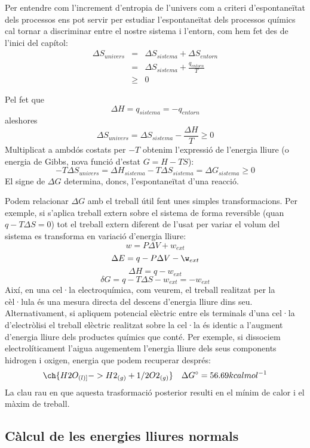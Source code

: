 Per entendre com l'increment d'entropia de l'univers com a criteri d'espontaneïtat dels processos ens pot servir per estudiar l'espontaneïtat dels processos químics cal tornar a discriminar entre el nostre sistema i l'entorn, com hem fet des de l'inici del capítol:
\begin{eqnarray*}
\Delta S_{univers} &= &\Delta S_{sistema} + \Delta S_{entorn}\\
&=&\Delta S_{sistema} + \frac{q_{entorn}}{T}\\
&\geq & 0
\end{eqnarray*}

Pel fet que
\[
\Delta H= q_{sistema} = -q_{entorn}
\]
aleshores
\[
\Delta S_{univers} = \Delta S_{sistema} - \frac{\Delta H}{T} \geq 0
\]
Multiplicat a ambdós costats per $-T$ obtenim l'expressió de l'energia lliure (o energia de Gibbs, nova funció d'estat $G=H-TS$):
\begin{equation}
-T \Delta S_{univers} = \Delta H_{sistema} -T\Delta S_{sistema}= \Delta G_{sistema} \geq 0
\label{Eq:Gibbs}
\end{equation}
El signe de $\Delta G$ determina, doncs, l'espontaneïtat d'una reacció.

Podem relacionar $\Delta G$ amb el treball útil fent unes simples transformacions. Per exemple, si s'aplica treball extern sobre el sistema de forma reversible (quan $q-T\Delta S=0$) tot el treball extern diferent de l'usat per variar el volum del sistema es transforma en variació d'energia lliure:
\[w=P\Delta V + w_{ext}\]
\[\Delta E = q-P\Delta V -\w_{ext}\]
\[\Delta H= q-w_{ext}\]
\[\delta G = q - T\Delta S -w_{ext} = -w_{ext}\]
Així, en una cel·la electroquímica, com veurem, el treball realitzat per la cèl·lula és una mesura directa del descens 
d'energia lliure dins seu. Alternativament, si apliquem potencial elèctric entre els terminals d'una cel·la d'electròlisi el treball elèctric realitzat sobre la cel·la és identic a l'augment d'energia lliure dels productes químics que conté. Per exemple, si dissociem electrolíticament l'aigua augementem l'energia lliure dels seus components hidrogen i oxigen, energia que podem recuperar després:
\[\ch{H2O_{(l)]} -> H2_{(g)} + 1/2 O2_{(g)}} \quad \Delta G^{\circ}= 56.69 kcal mol^{-1}\]
La clau rau en que aquesta trasformació posterior resulti en el mínim de calor i el màxim de treball.

\subsection{Càlcul de les energies lliures normals}

